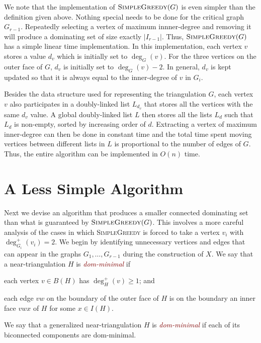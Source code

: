 \documentclass[12pt]{article}
\newcommand{\defin}[1]{\emph{\textcolor{Maroon}{#1}}}
\begin{document}
We note that the implementation of $\textsc{SimpleGreedy}(G)$ is even simpler than the definition given above.  Nothing special needs to be done for the critical graph $G_{r-1}$.  Repeatedly selecting a vertex of maximum innner-degree and removing it will produce a dominating set of size exactly $|I_{r-1}|$.  Thus, $\textsc{SimpleGreedy}(G)$ has a simple linear time implementation.  In this implementation, each vertex $v$ stores a value $d_v$ which is initially set to $\deg_G(v)$.  For the three vertices on the outer face of $G$, $d_v$ is initially set to $\deg_G(v)-2$.  In general, $d_v$ is kept updated so that it is always equal to the inner-degree of $v$ in $G_i$.

Besides the data structure used for representing the triangulation $G$, each vertex $v$ also participates in a doubly-linked list $L_{d_v}$  that stores all the vertices with the same $d_v$ value.  A global doubly-linked list $L$ then stores all the lists $L_d$ such that $L_d$ is non-empty, sorted by increasing order of $d$.   Extracting a vertex of maximum inner-degree can then be done in constant time and the total time spent moving vertices between different lists in $L$ is proportional to the number of edges of $G$. Thus, the entire algorithm can be implemented in $O(n)$ time.

\section{A Less Simple Algorithm}

Next we devise an algorithm that produces a smaller connected dominating set than what is guaranteed by $\textsc{SimpleGreedy}(G)$.  This involves a more careful analysis of the cases in which \textsc{SimpleGreedy} is forced to take a vertex $v_i$ with $\deg^+_{G_i}(v_i)=2$.  We begin by identifying unnecessary vertices and edges that can appear in the graphs $G_1,\ldots,G_{r-1}$ during the construction of $X$.   We say that a near-triangulation $H$ is \defin{dom-minimal} if
\begin{compactenum}[({DM}1)]
    \item each vertex $v\in B(H)$ has $\deg^+_H(v)\ge 1$; and \label{bad_vertex}
    \item each edge $vw$ on the boundary of the outer face of $H$ is on the boundary an inner face $vwx$ of $H$ for some $x\in I(H)$. \label{bad_edge}
\end{compactenum}
We say that a generalized near-triangulation $H$ is \defin{dom-minimal} if each of its biconnected components are dom-minimal.
\end{document}

